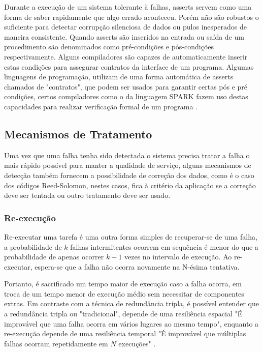 Durante a execução de um sistema tolerante à falhas, asserts servem como uma forma de saber rapidamente que algo errado aconteceu. Porém não são robustos o suficiente para detectar corrupção silenciosa de dados ou pulos inesperados de maneira consistente. Quando asserts são inseridos na entrada ou saída de um procedimento são denominados como pré-condições e pós-condições respectivamente. Alguns compiladores são capazes de automaticamente inserir estas condições para assegurar contratos da interface de um programa. Algumas linguagens de programação, utilizam de uma forma automática de asserts chamados de "contratos", que podem ser usados para garantir certas pós e pré condições, certos compiladores como o da linguagem SPARK fazem uso destas capacidades para realizar verificação formal de um programa \cite{SPARKContracts}.

\subsection{Mecanismos de Tratamento}

Uma vez que uma falha tenha sido detectada o sistema precisa tratar a falha o mais rápido possível para manter a qualidade de serviço, alguns mecanismos de detecção também fornecem a possibilidade de correção dos dados, como é o caso dos códigos Reed-Solomon, nestes casos, fica à critério da aplicação se a correção deve ser tentada ou outro tratamento deve ser usado.

\subsubsection{Re-execução}

Re-executar uma tarefa é uma outra forma simples de recuperar-se de uma falha, a probabilidade de $k$ falhas intermitentes ocorrem em sequência é menor do que a probabilidade de apenas ocorrer $k - 1$ vezes no intervalo de execução. Ao re-executar, espera-se que a falha não ocorra novamente na N-ésima tentativa. \cite{DependabilityInEmbeddedSystems}

Portanto, é sacrificado um tempo maior de execução caso a falha ocorra, em troca de um tempo menor de execução médio sem necessitar de componentes extras. Em contraste com a técnica de redundância tripla, é possível entender que a redundância tripla ou "tradicional", depende de uma resiliência espacial "É improvável que uma falha ocorra em vários lugares ao mesmo tempo", enquanto a re-execução depende de uma resiliência temporal "É improvável que múltiplas falhas ocorram repetidamente em $N$ execuções" \cite{FaultTolerantSystems}.

